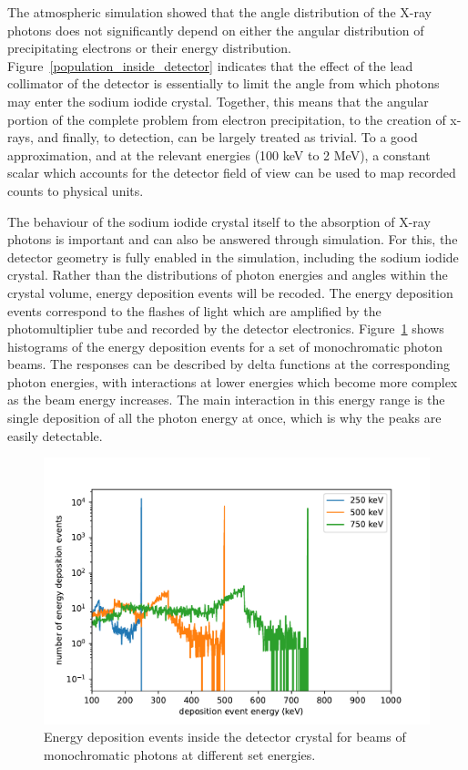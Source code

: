 The atmospheric simulation showed that the angle distribution of the X-ray photons does not significantly depend on either the angular distribution of precipitating electrons or their energy distribution. Figure~\ref{population_inside_detector} indicates that the effect of the lead collimator of the detector is essentially to limit the angle from which photons may enter the sodium iodide crystal. Together, this means that the angular portion of the complete problem from electron precipitation, to the creation of x-rays, and finally, to detection, can be largely treated as trivial. To a good approximation, and at the relevant energies (100 keV to 2 MeV), a constant scalar which accounts for the detector field of view can be used to map recorded counts to physical units.

The behaviour of the sodium iodide crystal itself to the absorption of X-ray photons is important and can also be answered through simulation. For this, the detector geometry is fully enabled in the simulation, including the sodium iodide crystal. Rather than the distributions of photon energies and angles within the crystal volume, energy deposition events will be recoded. The energy deposition events correspond to the flashes of light which are amplified by the photomultiplier tube and recorded by the detector electronics. Figure~\ref{detector_energy_response} shows histograms of the energy deposition events for a set of monochromatic photon beams. The responses can be described by delta functions at the corresponding photon energies, with interactions at lower energies which become more complex as the beam energy increases. The main interaction in this energy range is the single deposition of all the photon energy at once, which is why the peaks are easily detectable. 

\begin{figure}[p]
\label{detector_energy_response}
\includegraphics[width=\textwidth]{figures/chapter_3/detector_energy_response/detector_energy_response}
\caption{Energy deposition events inside the detector crystal for beams of monochromatic photons at different set energies. }
\end{figure}

